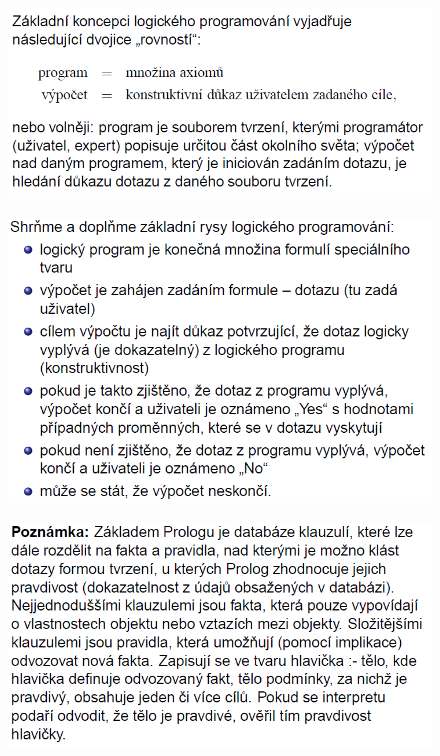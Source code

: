 \documentclass[10pt,a4paper]{article}
\theoremstyle{note}
\begin{document}
			\begin{figure}[H]
			\centering
			\includegraphics[width=13cm]{img/prolog3.png}
			\end{figure}

			\begin{figure}[H]
			\centering
			\includegraphics[width=13cm]{img/prolog4.png}
			\end{figure}

			\begin{figure}[H]
			\centering
			\includegraphics[width=13cm]{img/prolog5.png}
			\end{figure}
\end{document}
